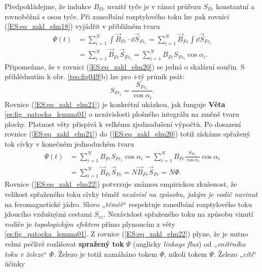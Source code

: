       Předpokládejme, že indukce \(B_{Fe}\) uvnitř tyče je v rámci průřezu \(S_{Fe}\) konstantní a 
      rovnoběžná s osou tyče. Při zanedbání rozptylového toku lze pak rovnici 
      (\ref{ES:eq_zakl_elm18}) vyjádřit v přibližném tvaru
      \begin{align}\label{ES:eq_zakl_elm20}
      \Psi(t) &= \sum_{i=1}^{N}\int\vec{B}_{Fe}\cdot \dd{\vec{S}}_{Fe_i} 
               = \sum_{i=1}^{N}\vec{B}_{Fe}\int \dd{\vec{S}}_{Fe_i}  \nonumber\\
              &= \sum_{i=1}^{N}\vec{B}_{Fe}\vec{S}_{Fe_i}
               = \sum_{i=1}^{N}B_{Fe}{S}_{Fe_i}\cos\alpha_i.
      \end{align}
      Připomeňme, že v rovnici (\ref{ES:eq_zakl_elm20}) se jedná o skalární součin. S přihlédnutím 
      k obr. \ref{teo:fig049}b) lze pro \emph{i}-tý průnik psát:
      \begin{equation}\label{ES:eq_zakl_elm21}
        S_{Fe_i} = \frac{S_{Fe_i}}{\cos\alpha_i}.
      \end{equation}
      Rovnice (\ref{ES:eq_zakl_elm21}) je konkrétní ukázkou, jak funguje \textbf{Věta} 
      \ref{es:fig_patocka_lemma01} o nezávislosti plošného integrálu na změně tvaru plochy. 
      Platnost věty přispívá k velkému zjednodušení výpočtů. Po dosazení rovnice 
      (\ref{ES:eq_zakl_elm21}) do (\ref{ES:eq_zakl_elm20}) totiž získáme spřažený tok cívky v 
      konečném jednoduchém tvaru
      \begin{align}\label{ES:eq_zakl_elm22}
        \Psi(t) &= \sum_{i=1}^{N}B_{Fe}{S}_{Fe_i}\cos\alpha_i 
                 = \sum_{i=1}^{N}B_{Fe}\frac{{S}_{Fe_i}}{\cos\alpha_i}\cos\alpha_i  \nonumber\\
                &= \sum_{i=1}^{N}\vec{B}_{Fe}\vec{S}_{Fe}
                 = N\vec{B}_{Fe}\vec{S}_{Fe} = N\Phi.
      \end{align}
      Rovnice (\ref{ES:eq_zakl_elm22}) potvrzuje známou empirickou zkušenost, že velikost 
      spřaženého toku cívky téměř \emph{nezávisí na způsobu, jakým je vodič navinut} na 
      feromagnetické jádro. Slovo „\emph{téměř}“ respektuje zanedbání rozptylového toku jdoucího 
      vzdušnými cestami \(S_{vz}\). Nezávislost spřaženého toku na způsobu vinutí vodiče je 
      \emph{topologickým efektem} přímo plynoucím z věty \ref{es:fig_patocka_lemma01}. Z rovnice 
      (\ref{ES:eq_zakl_elm22}) plyne, že je nutno velmi pečlivě rozlišovat \textbf{spražený tok} 
      \(\Psi\) (anglicky \emph{linkage flux}) od „\emph{vnitřního toku v železe}“ \(\Phi\). Železo 
      je totiž namáháno tokem \(\Phi\), nikoli tokem \(\Psi\). Železo „\emph{cítí}“ účinky 
